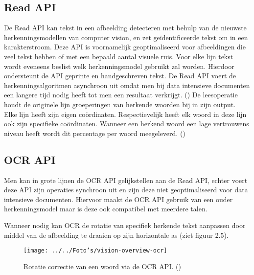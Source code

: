 \subsection{Read API}
De Read API kan tekst in een afbeelding detecteren met behulp van de nieuwste herkenningsmodellen van computer vision, en zet geïdentificeerde tekst om in een karakterstroom. Deze API is voornamelijk geoptimaliseerd voor afbeeldingen die veel tekst hebben of
met een bepaald aantal visuele ruis. Voor elke lijn tekst wordt eveneens beslist welk herkenningsmodel gebruikt zal worden. Hierdoor ondersteunt de API geprinte en handgeschreven tekst. De Read API voert de herkenningsalgoritmen asynchroon uit omdat men bij data intensieve documenten een langere tijd nodig heeft tot men een resultaat verkrijgt. (\cite{Microsoft2019})
\newline
\newline
De leesoperatie houdt de originele lijn groeperingen van herkende woorden bij in zijn output. Elke lijn heeft zijn eigen coördinaten. Respectievelijk heeft elk woord in deze lijn ook zijn specifieke coördinaten. Wanneer een herkend woord een lage vertrouwens niveau heeft wordt dit percentage per woord meegeleverd. (\cite{Microsoft2019})
\subsection{OCR API}
Men kan in grote lijnen de OCR API gelijkstellen aan de Read API, echter voert deze API zijn operaties synchroon uit en zijn deze niet geoptimaliseerd voor data intensieve documenten. Hiervoor maakt de OCR API gebruik van een ouder herkenningsmodel maar is deze ook compatibel met meerdere talen. 

Wanneer nodig kan OCR de rotatie van specifiek herkende tekst aanpassen door middel van de afbeelding te draaien op zijn horizontale as (ziet figuur 2.5).  
\begin{figure}[h]
	\texttt{[image: ../../Foto's/vision-overview-ocr]}
		\captionsetup{justification=centering,margin=2cm}
	\caption{Rotatie correctie van een woord via de OCR API. (\cite{Microsoft2019})}
	\centering
\end{figure}
